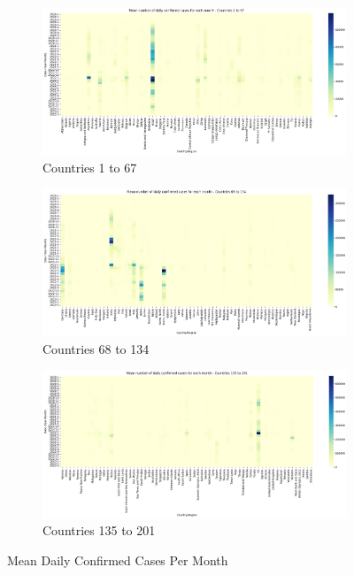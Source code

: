 \documentclass[12pt,oneside]{book} %
\begin{document}
\begin{figure}[H]
    \vspace{-15pt}
    \centering
    \begin{subfigure}[b]{\linewidth}
        \includegraphics[width=\linewidth]{images/mean-daily-confirmed-cases-per-month-1.png}
        \caption{Countries 1 to 67}\label{fig:sub1}
        \vspace{-2pt}
    \end{subfigure}
    \hfill
    \begin{subfigure}[b]{\linewidth}
        \includegraphics[width=\linewidth]{images/mean-daily-confirmed-cases-per-month-2.png}
        \caption{Countries 68 to 134}\label{fig:sub2}
        \vspace{-2pt}
    \end{subfigure}
    \hfill
    \begin{subfigure}[b]{\linewidth}
        \includegraphics[width=\linewidth]{images/mean-daily-confirmed-cases-per-month-3.png}
        \caption{Countries 135 to 201}\label{fig:sub3}
        \vspace{-5pt}
    \end{subfigure}
    \caption{Mean Daily Confirmed Cases Per Month}\label{fig:mean-daily-confirmed-cases-per-month}
\end{figure}
\end{document}
